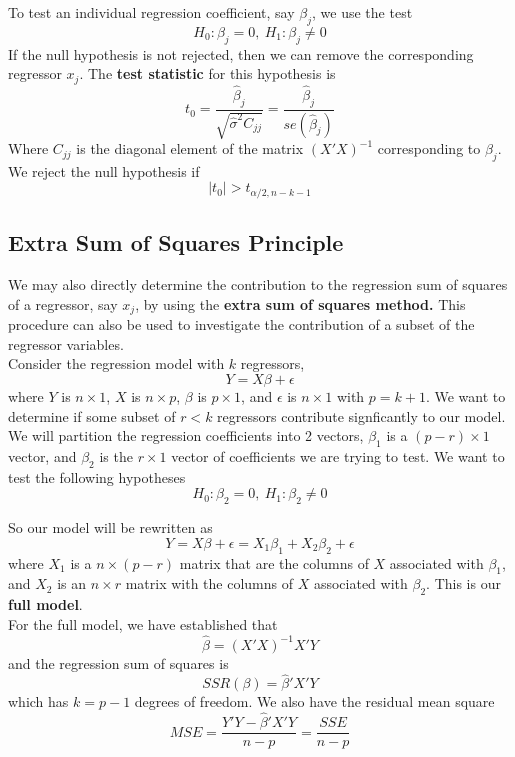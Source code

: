 To test an individual regression coefficient, say $\beta_j$, we use the test 
\[H_0: \beta_j = 0, \ H_1: \beta_j \neq 0\]
If the null hypothesis is not rejected, then we can remove the corresponding regressor $x_j$. The \textbf{test statistic} for this hypothesis is 
\[t_0 = \frac{\hat{\beta}_j}{\sqrt{\hat{\sigma}^2C_{jj}}} = \frac{\hat{\beta}_j}{se(\hat{\beta}_j)}\]
Where $C_{jj}$ is the diagonal element of the matrix $(X'X)^{-1}$ corresponding to $\beta_j$. We reject the null hypothesis if
\[|t_0| > t_{\alpha/2, n-k-1}\]
\subsection{Extra Sum of Squares Principle}

We may also directly determine the contribution to the regression sum of squares of a regressor, say $x_j$, by using the \textbf{extra sum of squares method.} This procedure can also be used to investigate the contribution of a subset of the regressor variables. \\

Consider the regression model with $k$ regressors, 
\[Y = X\beta + \epsilon\]
where $Y$ is $n\times 1$, $X$ is $n\times p$, $\beta$ is $p\times 1$, and $\epsilon$ is $n \times 1$ with $p = k+1$. We want to determine if some subset of $r < k$ regressors contribute signficantly to our model. We will partition the regression coefficients into 2 vectors, $\beta_1$ is a $(p-r) \times 1$ vector, and $\beta_2$ is the $r \times 1$ vector of coefficients we are trying to test. We want to test the following hypotheses
\[H_0: \beta_2 = 0, \ H_1: \beta_2 \neq 0\]

So our model will be rewritten as
\[Y = X\beta + \epsilon = X_1\beta_1 + X_2\beta_2 + \epsilon\]
where $X_1$ is a $n \times (p-r)$ matrix that are the columns of $X$ associated with $\beta_1$, and $X_2$ is an $n \times r$ matrix with the columns of $X$ associated with $\beta_2$. This is our \textbf{full model}.\\

For the full model, we have established that 
\[\hat{\beta} = (X'X)^{-1}X'Y\]
and the regression sum of squares is 
\[SSR(\beta) = \hat{\beta}'X'Y\]
which has $k = p-1$ degrees of freedom. We also have the residual mean square 
\[MSE = \frac{Y'Y - \hat{\beta}'X'Y}{n-p} = \frac{SSE}{n-p}\]

